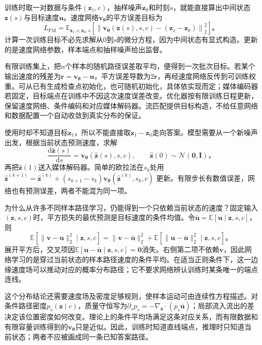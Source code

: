 训练时取一对数据与条件$(\bm z_1,c)$，抽样噪声$\bm z_0$和时刻$s$，就能直接算出中间状态$\bm z(s)$与目标速度$\bm u$。速度网络$\bm v_{\bm\theta}$的平方误差目标为
\begin{equation}
  L_{\mathrm{FM}}
  =\mathbb E_{\bm z_1,c,\bm z_0,s}
     \left[
       \left\lVert
         \bm v_{\bm\theta}(\bm z(s),s,c)
           -(\bm z_1-\bm z_0)
       \right\rVert_2^2
     \right]\text{。}
  \label{eq:vision-flow-loss}
\end{equation}
计算一次训练目标不必先求解从0到$s$的微分方程，因为中间状态有显式构造。更新的是速度网络参数，样本端点和抽样噪声给出监督。

有限训练集上，把$n$个样本的随机路径误差取平均，便得到一次批次目标。若某个输出速度的残差为$\bm r=\bm v_{\bm\theta}-\bm u$，平方误差导数为$2\bm r$，再经速度网络反传到可训练权重。可从已有生成检查点初始化，也可随机初始化，具体依实现而定；媒体编码器若固定，目标端点在训练中不因这次速度误差改变。优化器按有限训练日程更新，保留速度网络、条件编码和对应媒体解码器。流匹配提供目标构造，不给任意网络和数据配置一个自动收敛到真实分布的保证。

使用时却不知道目标$\bm z_1$，所以不能直接取$\bm z_1-\bm z_0$走向答案。模型需要从一个新噪声出发，根据当前状态预测速度，求解
\begin{equation}
  \frac{\mathrm d\widehat{\bm z}(s)}{\mathrm ds}
    =\bm v_{\bm\theta}(\widehat{\bm z}(s),s,c),
  \qquad
  \widehat{\bm z}(0)\sim\mathcal N(\bm0,\bm I)\text{，}
  \label{eq:vision-flow-ode}
\end{equation}
再把$\widehat{\bm z}(1)$送入媒体解码器。简单的欧拉法在$s_k$处用
$\widehat{\bm z}^{(k+1)}
=\widehat{\bm z}^{(k)}+(s_{k+1}-s_k)
\bm v_{\bm\theta}(\widehat{\bm z}^{(k)},s_k,c)$
更新。有限步长有数值误差，网络也有预测误差，两者不能混为同一项。

为什么从许多不同样本路径学习，仍能得到一个只依赖当前状态的速度？固定输入$(\bm z,s,c)$时，平方损失的最优预测是目标速度的条件均值。令$\bar{\bm u}=\mathbb E[\bm u\mid\bm z,s,c]$，则
\[
  \mathbb E[\lVert\bm v-\bm u\rVert_2^2\mid\bm z,s,c]
  =\lVert\bm v-\bar{\bm u}\rVert_2^2+
    \mathbb E[\lVert\bm u-\bar{\bm u}\rVert_2^2\mid\bm z,s,c]\text{。}
\]
展开平方后，交叉项因$\mathbb E[\bm u-\bar{\bm u}\mid\bm z,s,c]=\bm0$消失。右侧第二项不依赖$\bm v$，因此网络学习的是穿过当前状态的样本路径速度的条件平均。在适当正则条件下，这一边缘速度场可以推动对应的概率分布路径；它不要求网络辨认训练时某条唯一的端点连线。

这个分布结论还需要速度场及密度足够规则，使样本运动可由连续性方程描述。对条件路径密度$p_s(\bm z\mid c)$，质量守恒写为$\partial_s p_s=-\nabla_{\bm z}\cdot(p_s\bar{\bm u})$；局部流入流出的差决定该位置密度如何改变。理论上的条件平均场满足这条对应关系，而有限数据和有限容量训练得到的$\bm v_{\bm\theta}$只是近似。因此，训练时知道直线端点，推理时只知道当前状态；两者不应被画成同一条已知答案路径。

